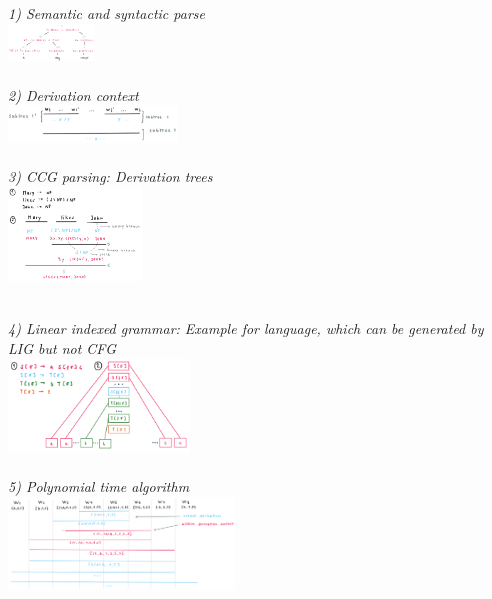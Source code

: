 \begin{multicols}{2}
\textit{1) Semantic and syntactic parse}\\
\includegraphics[height=10mm]{inhalt/images/NLP/06_semantic_parsing_1.png}
\\\\
\textit{2) Derivation context}\\
\includegraphics[height=10mm]{inhalt/images/NLP/06_semantic_parsing_2.png}
\\\\
\textit{3) CCG parsing: Derivation trees}\\
\includegraphics[height=25mm]{inhalt/images/NLP/06_semantic_parsing_3.png}
\\\\
\end{multicols}
\textit{4) Linear indexed grammar: Example for language, which can be generated by LIG but not CFG}\\
\includegraphics[height=25mm]{inhalt/images/NLP/06_semantic_parsing_4.png}
\\\\
\textit{5) Polynomial time algorithm}\\
\includegraphics[height=25mm]{inhalt/images/NLP/06_semantic_parsing_5.png}
\\\\